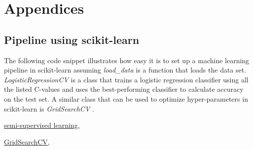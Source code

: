 \documentclass[fleqn,10pt]{SelfArx} %
\begin{document}





\section{Appendices}

\subsection{Pipeline using scikit-learn} \label{sklearn-example}

The following code snippet illustrates how easy it is to set up a machine
learning pipeline in scikit-learn assuming \textit{load\_data} is a function that
loads the data set. \textit{LogisticRegressionCV} is a class that trains a
logistic regression classifier using all the listed C-values and uses the
best-performing classifier to calculate accuracy on the test set. A similar
class that can be used to optimize hyper-parameters in scikit-learn is
\textit{GridSearchCV} \cite{gridsearchcv}.




\begin{thebibliography}{2}

  \href{http://scikit-learn.org/stable/modules/generated/sklearn.semi\_supervised.LabelSpreading.html}{semi-supervised learning,}

  \href{http://scikit-learn.org/stable/modules/generated/sklearn.model\_selection.GridSearchCV.html}{GridSearchCV}, \\
\end{thebibliography}

\end{document}
